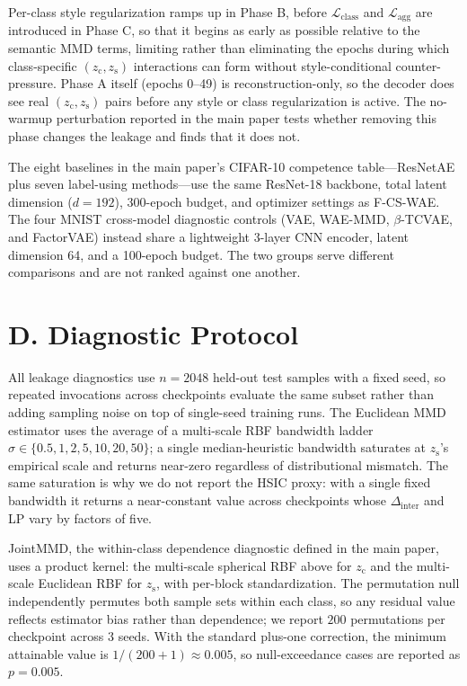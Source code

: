 \documentclass[letterpaper]{article}
\newcommand{\ours}{F-CS-WAE}
\newcommand{\zc}{z_{\mathrm{c}}}
\newcommand{\zs}{z_{\mathrm{s}}}
\newcommand{\Dinter}{\Delta_{\mathrm{inter}}}
\begin{document}
Per-class style regularization ramps up in Phase B, before
$\mathcal{L}_{\mathrm{class}}$ and $\mathcal{L}_{\mathrm{agg}}$ are
introduced in Phase C, so that it begins as early as possible relative to the
semantic MMD terms, limiting rather than eliminating the epochs during which
class-specific $(\zc,\zs)$ interactions can form without style-conditional
counter-pressure. Phase A itself (epochs 0--49) is reconstruction-only, so
the decoder does see real $(\zc,\zs)$ pairs before any style or class
regularization is active. The no-warmup perturbation reported in the main
paper tests whether removing this phase changes the leakage and finds that it
does not.

The eight baselines in the main paper's CIFAR-10 competence table---ResNetAE
plus seven label-using methods---use the same ResNet-18 backbone, total latent
dimension ($d{=}192$), 300-epoch budget, and optimizer settings as \ours{}.
The four MNIST cross-model diagnostic controls (VAE, WAE-MMD,
$\beta$-TCVAE, and FactorVAE) instead share a lightweight 3-layer CNN encoder,
latent dimension 64, and a 100-epoch budget. The two groups serve different
comparisons and are not ranked against one another.

\section{D. Diagnostic Protocol}

All leakage diagnostics use $n{=}2048$ held-out test samples with a fixed
seed, so repeated invocations across checkpoints evaluate the same subset
rather than adding sampling noise on top of single-seed training runs. The
Euclidean MMD estimator uses the average of a multi-scale RBF bandwidth
ladder $\sigma\in\{0.5,1,2,5,10,20,50\}$; a single median-heuristic
bandwidth saturates at $\zs$'s empirical scale and returns near-zero
regardless of distributional mismatch. The same saturation is why we do not
report the HSIC proxy: with a single fixed bandwidth it returns a
near-constant value across checkpoints whose $\Dinter$ and LP vary by factors
of five.

JointMMD, the within-class dependence diagnostic defined in the main paper,
uses a product kernel: the multi-scale
spherical RBF above for $\zc$ and the multi-scale Euclidean RBF for $\zs$,
with per-block standardization. The permutation null independently
permutes both sample sets within each class, so any residual value reflects
estimator bias rather than dependence; we report $200$ permutations per
checkpoint across 3 seeds. With the standard plus-one correction, the minimum
attainable value is $1/(200+1)\approx0.005$, so null-exceedance cases are
reported as $p{=}0.005$.
\end{document}
